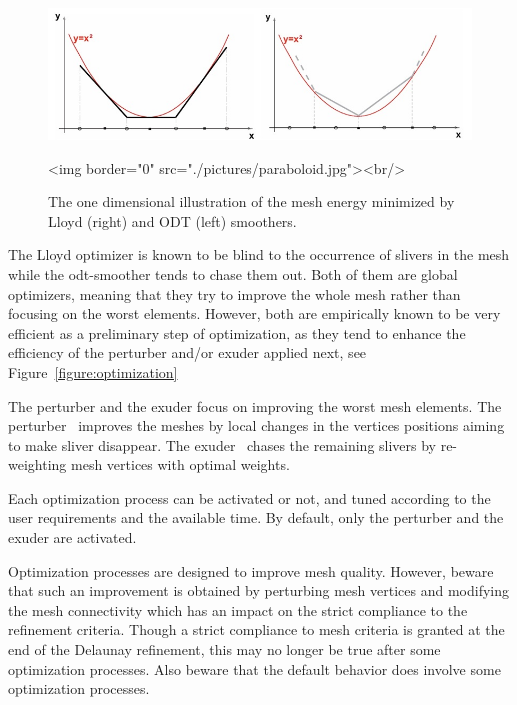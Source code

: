 \begin{figure}[ht]
\begin{center}
 \begin{ccTexOnly}
   \includegraphics[width=\textwidth]{Mesh_3/pictures/paraboloid}
 \end{ccTexOnly}
 \begin{ccHtmlOnly}
   <img border="0" src="./pictures/paraboloid.jpg"><br/>
 \end{ccHtmlOnly}
 \caption{The one dimensional illustration of the mesh energy minimized by Lloyd (right)  and ODT (left) smoothers.}
  \label{figure:ODT_Lloyd_energy}
\end{center}
\end{figure}

 The Lloyd optimizer is known to be blind to the occurrence of slivers in the mesh 
while the odt-smoother tends to chase them out.
Both of them are global optimizers, 
meaning that they try to improve
the whole mesh rather than focusing on the worst elements. However, both  are empirically known
to be very efficient as a preliminary step of optimization, as they tend to enhance the
efficiency of the perturber and/or exuder applied next, see Figure~\ref{figure:optimization}

The perturber and  the exuder focus on improving the worst mesh elements.
The perturber~\cite{cgal:tsa-ps3dd-09} improves the meshes by local changes
in  the vertices positions
aiming to make sliver disappear. The exuder~\cite{cgal:cdeft-slive-00}
chases the remaining slivers by
re-weighting mesh vertices with  optimal weights.

Each optimization process can be activated or not, and tuned
according to the user requirements and the available time.
By default, only the perturber and  the exuder are activated.

Optimization processes are designed to improve mesh quality. However, beware that such an improvement
is obtained by perturbing mesh vertices and modifying the mesh connectivity which has an impact
on the strict compliance to the refinement criteria. Though a strict compliance to mesh criteria
is granted at the end of the Delaunay refinement, this may  no longer be true after
some optimization processes. Also beware that the default behavior does involve some
optimization processes.


